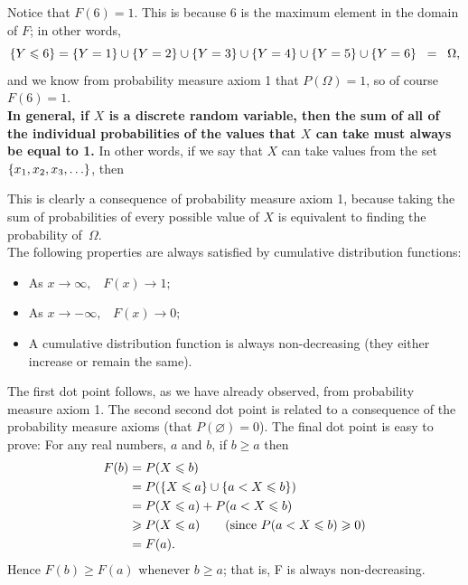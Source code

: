Notice that $F(6) = 1$. This is because $6$ is the maximum element in the domain of $F$; in other words, 
\[
\left\{Y \leqslant 6\right\} = \left\{Y = 1\right\} \cup \left\{Y = 2\right\} \cup \left\{Y = 3\right\} \cup \left\{Y = 4\right\} \cup \left\{Y = 5\right\} \cup \left\{Y = 6\right\} \;\; = \;\; \Omega,
\]
and we know from probability measure axiom 1 that $P(\Omega) = 1$, so of course $F(6) = 1$. \\

\noindent \textbf{In general, if $X$ is a discrete random variable, then the sum of all of the individual probabilities of the values that $X$ can take must always be equal to 1.} In other words, if we say that $X$ can take values from the set $\left\{x_1,x_2,x_3,\ldots\right\}$, then

  	\bigskip
	
	\hfil{}
	\bigskip
	\bigskip
	
\noindent This is clearly a consequence of probability measure axiom 1, because taking the sum of probabilities of every possible value of $X$ is equivalent to finding the probability of~$\Omega$. \\

\noindent The following properties are always satisfied by cumulative distribution functions:
\begin{itemize}
\item As $x \rightarrow \infty, \;\;\; F(x) \rightarrow 1;$
\item As $x \rightarrow -\infty, \;\;\; F(x) \rightarrow 0;$
\item A cumulative distribution function is always non-decreasing (they either increase or remain the same).
\end{itemize}
The first dot point follows, as we have already observed, from probability measure axiom 1. The second second dot point is related to a consequence of the probability measure axioms (that $P(\varnothing) = 0$). The final dot point is easy to prove: For any real numbers, $a$ and $b$, if $b \geq a$ then
\begin{align*}
F(b) & = P(X \leq b) \\
	& = P(\set{X \leq a} \cup \set{a < X \leq b}) \\
	& = P(X \leq a) + P(a < X \leq b) \\
	& \geq P(X \leq a) \tag{since $P(a < X \leq b) \geq 0$} \\
	& = F(a).
\end{align*}
Hence $F(b) \geq F(a)$ whenever $b \geq a$; that is, F is always non-decreasing.

